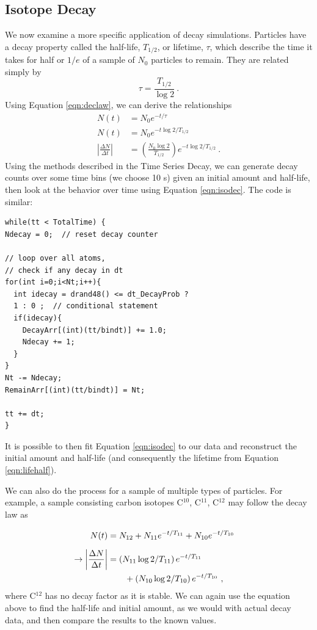 \documentclass[aps,prl,twocolumn,superscriptaddress]{revtex4-1}
\newcommand{\paren}[1]{\left( #1 \right)} 	%
\begin{document}
\subsection{Isotope Decay} 
We now examine a more specific application of decay simulations. Particles have a decay property called the half-life, $T_{1/2}$, or lifetime, $\tau$, which describe the time it takes for half or $1/e$ of a sample of $N_0$ particles to remain. They are related simply by \cite{Laulima}
\begin{equation}
\tau = \frac{T_{1/2}}{\log 2}~. \label{eqn:lifehalf}
\end{equation}
Using Equation \ref{eqn:declaw}, we can derive the relationships
\begin{align}
N(t) &= N_0 e^{-t/\tau} \\
N(t) &= N_0 e^{-t \log 2 / T_{1/2}} \\
\left| \frac{\Delta N}{\Delta t} \right| &= \paren{\frac{N_0 \log 2}{T_{1/2}}} e^{-t \log 2 / T_{1/2}} ~. \label{eqn:isodec}
\end{align}
Using the methods described in the Time Series Decay, we can generate decay counts over some time bins (we choose 10 s) given an initial amount and half-life, then look at the behavior over time using Equation \ref{eqn:isodec}. The code is similar:
\begin{lstlisting}
while(tt < TotalTime) {           
Ndecay = 0;  // reset decay counter

// loop over all atoms, 
// check if any decay in dt
for(int i=0;i<Nt;i++){ 
  int idecay = drand48() <= dt_DecayProb ? 
  1 : 0 ;  // conditional statement
  if(idecay){
    DecayArr[(int)(tt/bindt)] += 1.0;
    Ndecay += 1;
  }
}  
Nt -= Ndecay;
RemainArr[(int)(tt/bindt)] = Nt;

tt += dt;      
}
\end{lstlisting} 
It is possible to then fit Equation \ref{eqn:isodec} to our data and reconstruct the initial amount and half-life (and consequently the lifetime from Equation \ref{eqn:lifehalf}).

We can also do the process for a sample of multiple types of particles. For example, a sample consisting carbon isotopes C$^{10}$, C$^{11}$, C$^{12}$ may follow the decay law as
\begin{align}
\phantom{\rightarrow \left| \frac{\Delta N}{\Delta t} \right|}
&\begin{aligned}
\mathllap{N(t)} &= N_{12} + N_{11} e^{-t/T_{11}} + N_{10} e^{-t/T_{10}} 
\end{aligned} \\
&\begin{aligned}
\mathllap{\rightarrow \left| \frac{\Delta N}{\Delta t} \right|} &= \paren{N_{11} \log 2 / T_{11}} e^{-t/T_{11}} \\
&\qquad + \paren{N_{10} \log 2 / T_{10}} e^{-t/T_{10}} ~, \label{eqn:cardec}
\end{aligned}
\end{align}
where C$^{12}$ has no decay factor as it is stable. We can again use the equation above to find the half-life and initial amount, as we would with actual decay data, and then compare the results to the known values.
\end{document}
